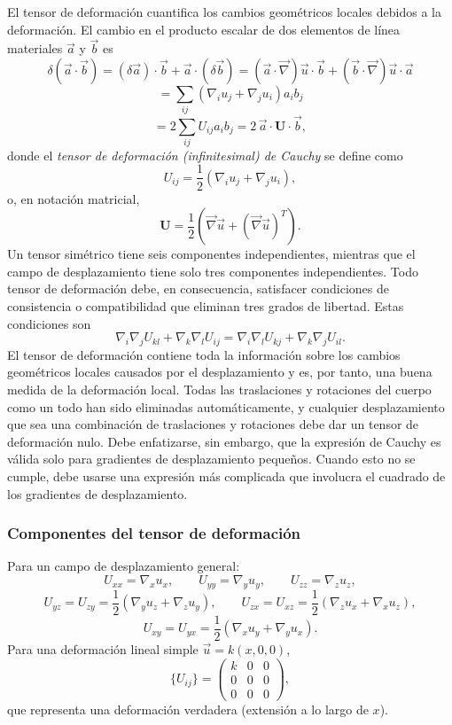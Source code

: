 El tensor de deformación cuantifica los cambios geométricos locales debidos a la deformación. El cambio en el producto escalar de dos elementos de línea materiales $\vec{a}$ y $\vec{b}$ es
\[ \delta(\vec{a}\cdot\vec{b}) = (\delta\vec{a})\cdot\vec{b} + \vec{a}\cdot(\delta\vec{b}) = (\vec{a}\cdot\vec{\nabla})\vec{u}\cdot\vec{b} + (\vec{b}\cdot\vec{\nabla})\vec{u}\cdot\vec{a} \tag{93} \]
\[ = \sum_{ij}\left(\nabla_i u_j + \nabla_j u_i\right)a_i b_j \tag{94} \]
\[ = 2\sum_{ij} U_{ij} a_i b_j = 2\,\vec{a}\cdot\mathbf{U}\cdot\vec{b}, \tag{95} \]
donde el \emph{tensor de deformación (infinitesimal) de Cauchy} se define como
\[ U_{ij} = \frac{1}{2}\left(\nabla_i u_j + \nabla_j u_i\right), \tag{96} \]
o, en notación matricial,
\[ \mathbf{U} = \frac{1}{2}\left(\vec{\nabla}\vec{u} + (\vec{\nabla}\vec{u})^{T}\right). \tag{97} \]
Un tensor simétrico tiene seis componentes independientes, mientras que el campo de desplazamiento tiene solo tres componentes independientes. Todo tensor de deformación debe, en consecuencia, satisfacer condiciones de consistencia o compatibilidad que eliminan tres grados de libertad. Estas condiciones son
\[ \nabla_i\nabla_j U_{kl} + \nabla_k\nabla_l U_{ij} = \nabla_i\nabla_l U_{kj} + \nabla_k\nabla_j U_{il}. \tag{98} \]
El tensor de deformación contiene toda la información sobre los cambios geométricos locales causados por el desplazamiento y es, por tanto, una buena medida de la deformación local. Todas las traslaciones y rotaciones del cuerpo como un todo han sido eliminadas automáticamente, y cualquier desplazamiento que sea una combinación de traslaciones y rotaciones debe dar un tensor de deformación nulo. Debe enfatizarse, sin embargo, que la expresión de Cauchy es válida solo para gradientes de desplazamiento pequeños. Cuando esto no se cumple, debe usarse una expresión más complicada que involucra el cuadrado de los gradientes de desplazamiento.

\subsubsection{Componentes del tensor de deformación}

Para un campo de desplazamiento general:
\[ U_{xx} = \nabla_x u_x, \qquad U_{yy} = \nabla_y u_y, \qquad U_{zz} = \nabla_z u_z, \tag{99} \]
\[ U_{yz} = U_{zy} = \frac{1}{2}\left(\nabla_y u_z + \nabla_z u_y\right), \qquad U_{zx} = U_{xz} = \frac{1}{2}\left(\nabla_z u_x + \nabla_x u_z\right), \]
\[ U_{xy} = U_{yx} = \frac{1}{2}\left(\nabla_x u_y + \nabla_y u_x\right). \tag{100} \]
Para una deformación lineal simple $\vec{u} = k(x, 0, 0)$,
\[ \{U_{ij}\} = \begin{pmatrix} k & 0 & 0 \\ 0 & 0 & 0 \\ 0 & 0 & 0 \end{pmatrix}, \tag{101} \]
que representa una deformación verdadera (extensión a lo largo de $x$).

